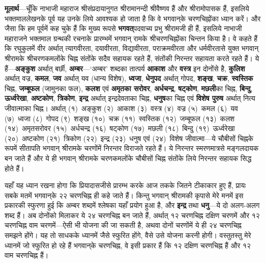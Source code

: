 \begin{sloppypar}\justifying{}
\textbf{मूलार्थ}—चूँकि नाभाजी महाराज श्रीसंप्रदायानुगत श्रीरामानन्दी श्रीवैष्णव हैं और श्रीरामोपासक हैं, इसलिये भक्तमाल\-लेखनके पूर्व यह उनके लिये आवश्यक हो जाता है कि वे भगवान्‌के चरणचिह्नोंका ध्यान करें। और जैसा कि हम पूर्वमें कह चुके हैं कि मुख्य रूपसे \textbf{भगवत्}पदवाच्य प्रभु श्रीरामजी ही हैं, इसलिये नाभाजी महाराजने भक्तमाल ग्रन्थकी रचनाके प्रारम्भमें भगवान् रामके श्रीचरणचिह्नोंका चिन्तन किया है। वे कहते हैं कि रघुकुलमें वीर अर्थात् त्यागवीरता, दयावीरता, विद्यावीरता, पराक्रमवीरता और धर्मवीरतासे युक्त भगवान् श्रीरामके श्रीचरणकमलोंके चिह्न संतोंके सदैव सहायक रहते हैं, संतोंकी निरन्तर सहायता करते रहते हैं। ये हैं—\textbf{अङ्कुश} अर्थात् बर्छी, \textbf{अम्बर}—‘अम्बर’ शब्दका तात्पर्य \textbf{आकाश} और \textbf{वस्त्र} इन दोनोंसे है, \textbf{कुलिश} अर्थात् वज्र, \textbf{कमल}, \textbf{जव} अर्थात् यव (धान्य विशेष), \textbf{ध्वजा}, \textbf{धेनुपद} अर्थात् गोपद, \textbf{शङ्ख}, \textbf{चक्र}, \textbf{स्वस्तिक} चिह्न, \textbf{जम्बूफल} (जामुनका फल), \textbf{कलश} एवं \textbf{अमृतका सरोवर}, \textbf{अर्धचन्द्र}, \textbf{षट्कोण}, \textbf{मछली}का चिह्न, \textbf{बिन्दु}, \textbf{ऊर्ध्वरेखा}, \textbf{अष्टकोण}, \textbf{त्रिकोण}, \textbf{इन्द्र} अर्थात् इन्द्रदेवताका चिह्न, \textbf{धनुष}का चिह्न एवं \textbf{विशेष पुरुष} अर्थात् नित्य जीवात्माका चिह्न। अर्थात् (१)~अङ्कुश (२)~आकाश (३)~वस्त्र (४)~वज्र (५)~कमल (६)~यव (७)~ध्वजा (८)~गोपद (९)~शङ्ख (१०)~चक्र (११)~स्वस्तिक (१२)~जम्बूफल (१३)~कलश (१४)~अमृतसरोवर (१५)~अर्धचन्द्र (१६)~षट्कोण (१७)~मछली (१८)~बिन्दु (१९)~ऊर्ध्वरेखा (२०)~अष्टकोण (२१)~त्रिकोण (२२)~इन्द्र (२३)~धनुष एवं (२४)~विशेष जीवात्मा—ये चौबीसों चिह्नके रूपमें सीतापति भगवान् श्रीरामके चरणोंमें निरन्तर विराजते रहते हैं। ये निरन्तर स्मरण\-मात्रसे मङ्गलदायक बन जाते हैं और ये ही भगवान् श्रीरामके चरणकमलोंके चौबीसों चिह्न संतोंके लिये निरन्तर सहायक सिद्ध होते हैं।
\end{sloppypar}
\begin{sloppypar}\justifying{}
यहाँ यह ध्यान रखना होगा कि प्रियादासजीसे प्रारम्भ करके आज तकके जितने टीकाकार हुए हैं, प्रायः सबके मतमें भगवान्‌के २२ चरणचिह्न ही कहे जाते हैं। किन्तु भगवान् श्रीरामकी कृपासे मेरे मनमें इस प्रकारकी स्फुरणा हुई कि अम्बर शब्दमें श्लेषका यहाँ प्रयोग हुआ है, और \textbf{इन्द्र} तथा \textbf{धनु}—ये दो अलग-अलग शब्द हैं। अब दोनोंको मिलाकर ये २४ चरणचिह्न बन जाते हैं, अर्थात् १२ चरणचिह्न दक्षिण चरणमें और १२ चरणचिह्न वाम चरणमें—ऐसी भी योजना की जा सकती है, अथवा दोनों चरणोंमें ये ही २४ चरणचिह्न समझने होंगे। यह तो साधकके ध्यानमें जैसे स्फुरित होंगे, वैसे उसे योजना करनी होगी। वस्तुतस्तु मेरे ध्यानमें जो स्फुरित हो रहे हैं भगवान्‌के चरणचिह्न, वे इसी प्रकार हैं कि १२ दक्षिण चरणचिह्न हैं और १२ वाम चरणचिह्न हैं।
\end{sloppypar}
